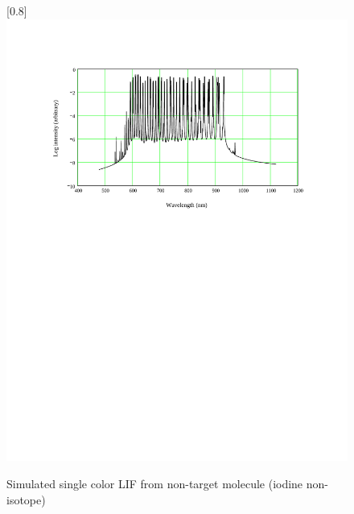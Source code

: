 \begin{figure}
\scalebox{0.8}[0.8]{
\includegraphics[bb=50 450 489 680]
{non-target_1/non-target_1.pdf}
}
\caption[Simulated single color LIF from non-target molecule (iodine non-isotope)]{Simulated single color LIF from non-target molecule (iodine non-isotope)}
\label{non-target_1}
\end{figure}
